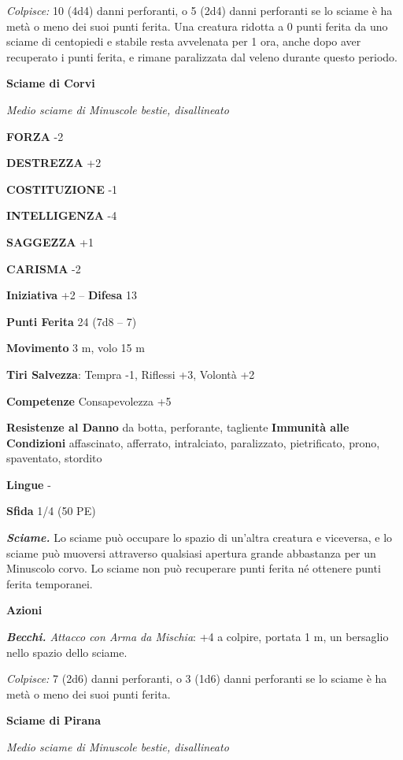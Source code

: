 \begin{multicols}{2}
\emph{Colpisce:} 10 (4d4) danni perforanti, o 5 (2d4) danni perforanti se lo sciame è ha metà o meno dei suoi punti ferita. Una creatura ridotta a 0 punti ferita da uno sciame di centopiedi e stabile resta avvelenata per 1 ora, anche dopo aver recuperato i punti ferita, e rimane paralizzata dal veleno durante questo periodo.

\medskip\textbf{Sciame di Corvi}

\emph{Medio sciame di Minuscole bestie, disallineato}

\textbf{FORZA} -2

\textbf{DESTREZZA} +2

\textbf{COSTITUZIONE} -1

\textbf{INTELLIGENZA} -4

\textbf{SAGGEZZA} +1

\textbf{CARISMA} -2

\textbf{Iniziativa} +2 -- \textbf{Difesa} 13

\textbf{Punti Ferita} 24 (7d8 -- 7)

\textbf{Movimento} 3 m, volo 15 m

\textbf{Tiri Salvezza}: Tempra -1, Riflessi +3, Volontà +2

\textbf{Competenze} Consapevolezza +5

\textbf{Resistenze al Danno} da botta, perforante, tagliente \textbf{Immunità alle Condizioni} affascinato, afferrato, intralciato, paralizzato, pietrificato, prono, spaventato, stordito

\textbf{Lingue} -

\textbf{Sfida} 1/4 (50 PE)

\emph{\textbf{Sciame.}} Lo sciame può occupare lo spazio di un'altra creatura e viceversa, e lo sciame può muoversi attraverso qualsiasi apertura grande abbastanza per un Minuscolo corvo. Lo sciame non può recuperare punti ferita né ottenere punti ferita temporanei.

\textbf{Azioni}

\emph{\textbf{Becchi.} Attacco con Arma da Mischia}: +4 a colpire, portata 1 m, un bersaglio nello spazio dello sciame.

\emph{Colpisce:} 7 (2d6) danni perforanti, o 3 (1d6) danni perforanti se lo sciame è ha metà o meno dei suoi punti ferita.

\medskip\textbf{Sciame di Pirana}

\emph{Medio sciame di Minuscole bestie, disallineato}


\end{multicols}
